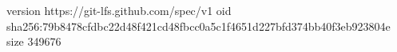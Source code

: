 version https://git-lfs.github.com/spec/v1
oid sha256:79b8478cfdbc22d48f421cd48fbcc0a5c1f4651d227bfd374bb40f3eb923804e
size 349676
